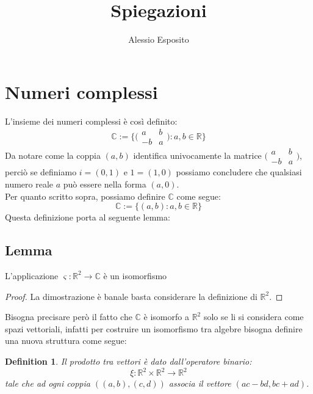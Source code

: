 \documentclass{article}
\title{Spiegazioni}
\author{Alessio Esposito}
\newtheorem{definition}{Definition}
\begin{document}
\maketitle
    \section*{Numeri complessi}
        L'insieme dei numeri complessi è così definito:
        \begin{equation*}
            \mathbb{C} := \{ \big(\begin{smallmatrix} a & b \\ -b & a \end{smallmatrix} \big) : a,b \in \mathbb{R} \}
        \end{equation*}
        Da notare come la coppia $(a,b)$ identifica univocamente la matrice $\big(\begin{smallmatrix} a & b \\ -b & a \end{smallmatrix} \big)$, perciò se definiamo $i = (0,1)$ e $1 = (1, 0)$ possiamo concludere che qualsiasi numero reale $a$ può essere nella forma $(a,0)$. \\
        Per quanto scritto sopra, possiamo definire $\mathbb{C}$ come segue:
        \begin{equation*}
            \mathbb{C} := \{ (a,b) : a,b \in \mathbb{R} \}
        \end{equation*} 
        Questa definizione porta al seguente lemma:
       \subsection*{Lemma}
        L'applicazione $\varsigma : \mathbb{R}^2 \rightarrow \mathbb{C}$ è un isomorfismo
        \begin{proof}
            La dimostrazione è banale basta considerare la definizione di $\mathbb{R}^2$.    
        \end{proof}
    Bisogna precisare però il fatto che $\mathbb{C}$ è isomorfo a $\mathbb{R}^2$ solo se li si considera come spazi vettoriali, infatti per costruire un isomorfismo tra algebre bisogna definire una nuova struttura come segue:
    \begin{definition}
        Il prodotto tra vettori è dato dall'operatore binario: 
        \begin{equation*}
            \xi : \mathbb{R}^2 \times \mathbb{R}^2 \rightarrow \mathbb{R}^2
        \end{equation*}
        tale che ad ogni coppia $((a,b),(c,d))$ associa il vettore $(ac - bd, bc + ad).$

    \end{definition}
\end{document}
